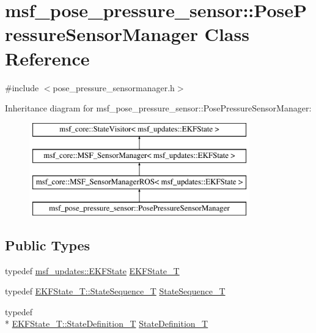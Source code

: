\hypertarget{classmsf__pose__pressure__sensor_1_1PosePressureSensorManager}{\section{msf\-\_\-pose\-\_\-pressure\-\_\-sensor\-:\-:Pose\-Pressure\-Sensor\-Manager Class Reference}
\label{classmsf__pose__pressure__sensor_1_1PosePressureSensorManager}
}


{\ttfamily \#include $<$pose\-\_\-pressure\-\_\-sensormanager.\-h$>$}

Inheritance diagram for msf\-\_\-pose\-\_\-pressure\-\_\-sensor\-:\-:Pose\-Pressure\-Sensor\-Manager\-:\begin{figure}[H]
\begin{center}
\leavevmode
\includegraphics[height=4.000000cm]{classmsf__pose__pressure__sensor_1_1PosePressureSensorManager}
\end{center}
\end{figure}
\subsection*{Public Types}
\begin{DoxyCompactItemize}
\item 
typedef \hyperlink{namespacemsf__updates_a03b0801c76b7400623b00ad4d28f9bcc}{msf\-\_\-updates\-::\-E\-K\-F\-State} \hyperlink{classmsf__pose__pressure__sensor_1_1PosePressureSensorManager_aa1bbb3e013d34230c78f161de7a0982f}{E\-K\-F\-State\-\_\-\-T}
\item 
typedef \hyperlink{structmsf__core_1_1GenericState__T_a75fe70f7c7517dbf7d4c91b75b08a1dd}{E\-K\-F\-State\-\_\-\-T\-::\-State\-Sequence\-\_\-\-T} \hyperlink{classmsf__pose__pressure__sensor_1_1PosePressureSensorManager_adf843cc0cf10a8d9e48cbb1761095200}{State\-Sequence\-\_\-\-T}
\item 
typedef \\*
\hyperlink{structmsf__core_1_1GenericState__T_a9a7d65b0325658ab07b81960a3ed4604}{E\-K\-F\-State\-\_\-\-T\-::\-State\-Definition\-\_\-\-T} \hyperlink{classmsf__pose__pressure__sensor_1_1PosePressureSensorManager_a5a76c4d760cbc0972471188dbc47536a}{State\-Definition\-\_\-\-T}
\end{DoxyCompactItemize}

